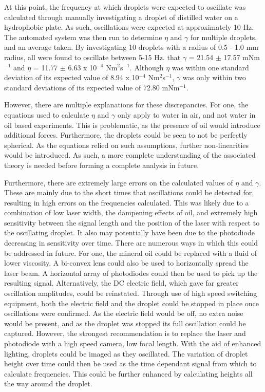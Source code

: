 \documentclass{physics_article_B}
\begin{document}
    At this point, the frequency at which droplets were expected to oscillate was calculated through manually investigating a droplet of distilled water on a hydrophobic plate. As such, oscillations were expected at approximately 10 Hz. The automated system was then run to determine $\eta$ and $\gamma$ for multiple droplets, and an average taken. By investigating 10 droplets with a radius of 0.5 - 1.0 mm radius, all were found to oscillate between 5-15 Hz. that $\gamma$ = 21.54 $\pm$ 17.57 mNm$^{-1}$ and $\eta$ = 11.77 $\pm$ 6.63 x 10$^{-4}$ Nm$^{2}$s$^{-1}$. Although $\eta$ was within one standard deviation of its expected value of \cite{expected2} 8.94 x 10$^{-4}$ Nm$^{2}$s$^{-1}$, $\gamma$ was only within two standard deviations of its expected value of\cite{expected1} 72.80 mNm$^{-1}$.
    
    However, there are multiple explanations for these discrepancies. For one, the equations used to calculate $\eta$ and $\gamma$ only apply to water in air, and not water in oil based experiments. This is problematic, as the presence of oil would introduce additional forces. Furthermore, the droplets could be seen to not be perfectly spherical. As the equations relied on such assumptions, further non-linearities would be introduced. As such, a more complete understanding of the associated theory is needed before forming a complete analysis in future.
    
    Furthermore, there are extremely large errors on the calculated values of $\eta$ and $\gamma$. These are mainly due to the short times that oscillations could be detected for, resulting in high errors on the frequencies calculated. This was likely due to a combination of low laser width, the dampening effects of oil, and extremely high sensitivity between the signal length and the position of the laser with respect to the oscillating droplet. It also may potentially have been due to the photodiode decreasing in sensitivity over time. There are numerous ways in which this could be addressed in future. For one, the mineral oil could be replaced with a fluid of lower viscosity. A bi-convex lens could also be used to horizontally spread the laser beam. A horizontal array of photodiodes could then be used to pick up the resulting signal. Alternatively, the DC electric field, which gave far greater oscillation amplitudes, could be reinstated. Through use of high speed switching equipment, both the electric field and the droplet could be stopped in place once oscillations were confirmed. As the electric field would be off, no extra noise would be present, and as the droplet was stopped its full oscillation could be captured. However, the strongest recommendation is to replace the laser and photodiode with a high speed camera, low focal length. With the aid of enhanced lighting, droplets could be imaged as they oscillated. The variation of droplet height over time could then be used as the time dependant signal from which to calculate frequencies. This could be further enhanced by calculating heights all the way around the droplet. 
    
\end{document}
